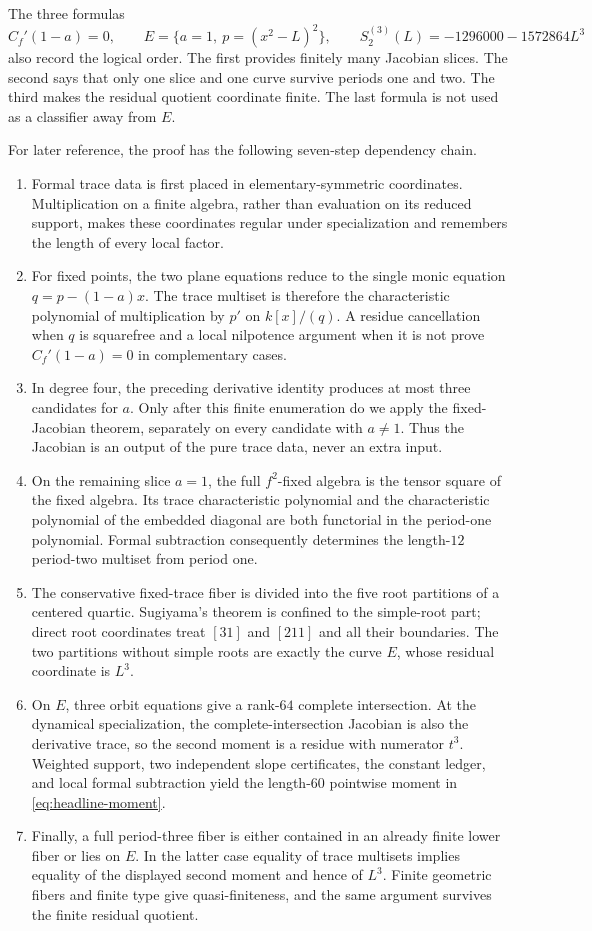 \documentclass[11pt]{article}
\theoremstyle{definition}
\begin{document}
The three formulas
\[
C_f'(1-a)=0,
\qquad
E=\{a=1,\ p=(x^2-L)^2\},
\qquad
S^{(3)}_2(L)=-1296000-1572864L^3
\]
also record the logical order. The first provides finitely many Jacobian slices. The second says that only one slice and one curve survive periods one and two. The third makes the residual quotient coordinate finite. The last formula is not used as a classifier away from $E$.

For later reference, the proof has the following seven-step dependency chain.
\begin{enumerate}[leftmargin=2.2em]
\item Formal trace data is first placed in elementary-symmetric coordinates. Multiplication on a finite algebra, rather than evaluation on its reduced support, makes these coordinates regular under specialization and remembers the length of every local factor.
\item For fixed points, the two plane equations reduce to the single monic equation $q=p-(1-a)x$. The trace multiset is therefore the characteristic polynomial of multiplication by $p'$ on $k[x]/(q)$. A residue cancellation when $q$ is squarefree and a local nilpotence argument when it is not prove $C_f'(1-a)=0$ in complementary cases.
\item In degree four, the preceding derivative identity produces at most three candidates for $a$. Only after this finite enumeration do we apply the fixed-Jacobian theorem, separately on every candidate with $a\ne1$. Thus the Jacobian is an output of the pure trace data, never an extra input.
\item On the remaining slice $a=1$, the full $f^2$-fixed algebra is the tensor square of the fixed algebra. Its trace characteristic polynomial and the characteristic polynomial of the embedded diagonal are both functorial in the period-one polynomial. Formal subtraction consequently determines the length-$12$ period-two multiset from period one.
\item The conservative fixed-trace fiber is divided into the five root partitions of a centered quartic. Sugiyama's theorem is confined to the simple-root part; direct root coordinates treat $[31]$ and $[211]$ and all their boundaries. The two partitions without simple roots are exactly the curve $E$, whose residual coordinate is $L^3$.
\item On $E$, three orbit equations give a rank-$64$ complete intersection. At the dynamical specialization, the complete-intersection Jacobian is also the derivative trace, so the second moment is a residue with numerator $t^3$. Weighted support, two independent slope certificates, the constant ledger, and local formal subtraction yield the length-$60$ pointwise moment in \eqref{eq:headline-moment}.
\item Finally, a full period-three fiber is either contained in an already finite lower fiber or lies on $E$. In the latter case equality of trace multisets implies equality of the displayed second moment and hence of $L^3$. Finite geometric fibers and finite type give quasi-finiteness, and the same argument survives the finite residual quotient.
\end{enumerate}
\end{document}
